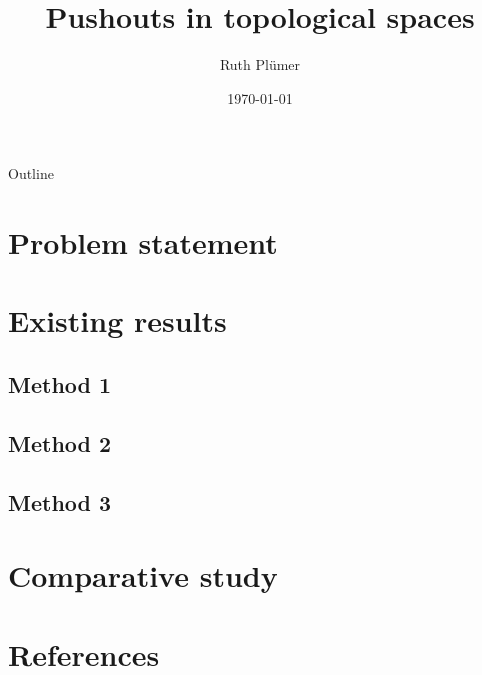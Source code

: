 \documentclass{beamer}
\title{Pushouts in topological spaces}
\author{Ruth Plümer}
\date{\today}
\begin{document}
	\begin{frame}
		\titlepage 
	\end{frame}
	\begin{frame}{Outline}
		\tableofcontents
	\end{frame}
	\section{Problem statement}
	\section{Existing results}
	\subsection{Method 1}
	\subsection{Method 2}
	\subsection{Method 3}
	\section{Comparative study}
	\section*{References}
	\begin{frame}
	\end{frame}
\end{document}
